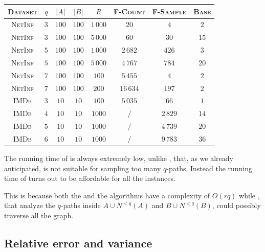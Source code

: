 \begin{table}[h]
	\centering
	\begin{tabular}{|c|c|c|c|c|c|c|c|}
		\hline
		\textsc{Dataset} & $q$ & $|A|$ & $|B|$ & $R$      & \textsc{F-Count} & \textsc{F-Sample} & \textsc{Base} \\ \hline \hline
		\textsc{NetInf}  & $3$ & $100$ & $100$ & $1\,000$ & $20$             & $4$               & $2$           \\ \hline
		\textsc{NetInf}  & $3$ & $100$ & $100$ & $5\,000$ & $60$             & $30$              & $15$          \\ \hline
		\textsc{NetInf}  & $5$ & $100$ & $100$ & $1\,000$ & $2\,682$         & $426$             & $3$           \\ \hline
		\textsc{NetInf}  & $5$ & $100$ & $100$ & $5\,000$ & $4\,767$         & $784$             & $20$          \\ \hline
		\textsc{NetInf}  & $7$ & $100$ & $100$ & $100$    & $5\,455$         & $4$               & $2$           \\ \hline
		\textsc{NetInf}  & $7$ & $100$ & $100$ & $200$    & $16\,634$        & $197$             & $2$           \\ \hline \hline
		\textsc{IMDb}    & $3$ & $10$  & $10$  & $100$    & $5\,035$         & $66$              & $1$           \\ \hline
		\textsc{IMDb}    & $4$ & $10$  & $10$  & $1000$   & $/$              & $2\,829$          & $14$          \\ \hline
		\textsc{IMDb}    & $5$ & $10$  & $10$  & $1000$   & $/$              & $4\,739$          & $20$          \\ \hline
		\textsc{IMDb}    & $6$ & $10$  & $10$  & $1000$   & $/$              & $9\,783$          & $36$          \\ \hline
	\end{tabular}
\end{table}

The running time of \base is always extremely low, 
unlike \fcount, that, as we already anticipated, is not suitable for sampling too many $q$-paths.
Instead the running time of \fsamp turns out to be affordable for all the instances. 

This is because both the \fsamp and the \base algorithms have a complexity of $O(rq)$ while 
\fcount, that analyze the $q$-paths inside $A \cup N^{<q}(A)$ and $B \cup N^{<q}(B)$, could possibly traverse all the graph.

\subsection*{Relative error and variance}

